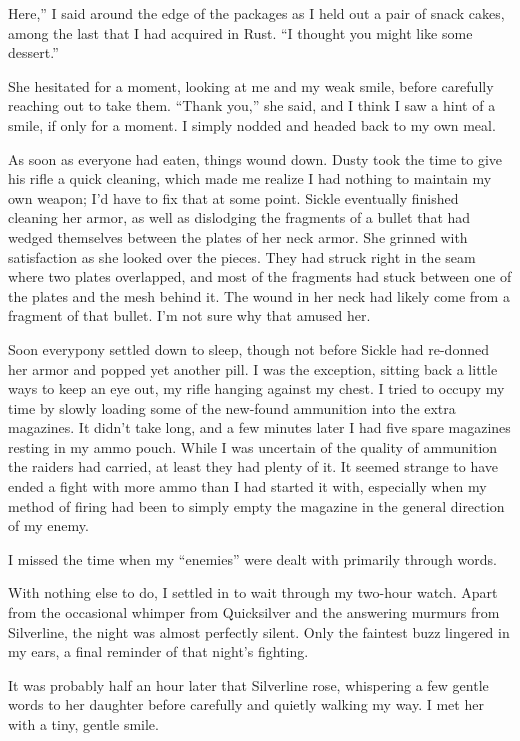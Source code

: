 \leavevmode{}Here,” I said around the edge of the packages as I held out a pair of snack cakes, among the last that I had acquired in Rust. “I thought you might like some dessert.”

She hesitated for a moment, looking at me and my weak smile, before carefully reaching out to take them. “Thank you,” she said, and I think I saw a hint of a smile, if only for a moment. I simply nodded and headed back to my own meal.

As soon as everyone had eaten, things wound down. Dusty took the time to give his rifle a quick cleaning, which made me realize I had nothing to maintain my own weapon; I’d have to fix that at some point. Sickle eventually finished cleaning her armor, as well as dislodging the fragments of a bullet that had wedged themselves between the plates of her neck armor. She grinned with satisfaction as she looked over the pieces. They had struck right in the seam where two plates overlapped, and most of the fragments had stuck between one of the plates and the mesh behind it. The wound in her neck had likely come from a fragment of that bullet. I’m not sure why that amused her.

Soon everypony settled down to sleep, though not before Sickle had re-donned her armor and popped yet another pill. I was the exception, sitting back a little ways to keep an eye out, my rifle hanging against my chest. I tried to occupy my time by slowly loading some of the new-found ammunition into the extra magazines. It didn’t take long, and a few minutes later I had five spare magazines resting in my ammo pouch. While I was uncertain of the quality of ammunition the raiders had carried, at least they had plenty of it. It seemed strange to have ended a fight with more ammo than I had started it with, especially when my method of firing had been to simply empty the magazine in the general direction of my enemy.

I missed the time when my “enemies” were dealt with primarily through words.

With nothing else to do, I settled in to wait through my two-hour watch. Apart from the occasional whimper from Quicksilver and the answering murmurs from Silverline, the night was almost perfectly silent. Only the faintest buzz lingered in my ears, a final reminder of that night’s fighting.

It was probably half an hour later that Silverline rose, whispering a few gentle words to her daughter before carefully and quietly walking my way. I met her with a tiny, gentle smile.

